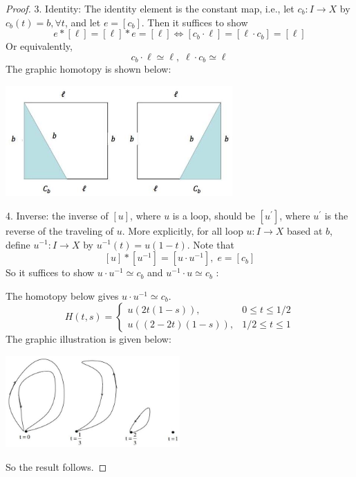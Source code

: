 \begin{proof}
3. Identity: The identity element is the constant map, i.e., let \({c}_{b} : I \rightarrow  X\) by \({c}_{b}\left( t\right)  =b,\forall t\), and let \(e  = \left\lbrack  {c}_{b}\right\rbrack\). Then it suffices to show
\[
e * \left\lbrack  \ell \right\rbrack   = \left\lbrack  \ell \right\rbrack   * e  = \left\lbrack  \ell \right\rbrack   \Leftrightarrow  \left\lbrack  {{c}_{b} \cdot  \ell }\right\rbrack   = \left\lbrack  {\ell  \cdot  {c}_{b}}\right\rbrack   = \left\lbrack  \ell \right\rbrack
\]
Or equivalently,
\[
{c}_{b} \cdot  \ell  \simeq  \ell,\;\ell  \cdot  {c}_{b} \simeq  \ell
\]
The graphic homotopy is shown below:
\begin{center}
\includegraphics[width=0.65\textwidth]{images/Ch7_identity_pi1.jpg}
\end{center}
4. Inverse: the inverse of \(\left\lbrack  u\right\rbrack\), where \(u\) is a loop, should be \(\left\lbrack  {u}^{\prime }\right\rbrack\), where \({u}^{\prime }\) is the reverse of the traveling of \(u\). More explicitly, for all loop \(u : I \rightarrow  X\) based at \(b\), define \({u}^{-1} : I \rightarrow  X\) by \({u}^{-1}\left( t\right)  = u\left( {1 - t}\right)\). Note that
\[
\left\lbrack  u\right\rbrack   * \left\lbrack  {u}^{-1}\right\rbrack   = \left\lbrack  {u \cdot  {u}^{-1}}\right\rbrack ,\;e = \left\lbrack  {c}_{b}\right\rbrack
\]
So it suffices to show \(u \cdot  {u}^{-1} \simeq  {c}_{b}\) and \({u}^{-1} \cdot  u \simeq  {c}_{b}\) :

The homotopy below gives \(u \cdot  {u}^{-1} \simeq  {c}_{b}\).
\[
H\left( {t,s}\right)  = \left\{  \begin{array}{rr} u\left( {{2t}\left( {1 - s}\right) }\right), & 0 \leq  t \leq  1/2 \\  u\left( {\left( {2 - {2t}}\right) \left( {1 - s}\right) }\right), & 1/2 \leq  t \leq  1 \end{array}\right.
\]
The graphic illustration is given below:
\begin{center}
\includegraphics[width=0.5\textwidth]{images/Ch7_inverse_pi1.jpg}
\end{center}
So the result follows.
\end{proof}

